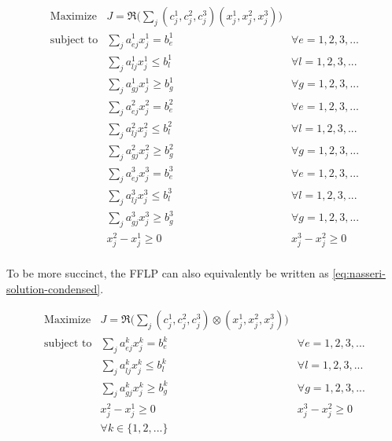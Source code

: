 \documentclass[11pt,a4paper,final]{article}
\let\ref\autoref                                      %
\begin{document}
\begin{equation}
\label{eq:nasseri-solution}
\begin{array}{lll}
\text{Maximize}   & J = \mathfrak{R}\Big(\sum_j (c_j^1,c_j^2,c_j^3)(x_j^1,x_j^2,x_j^3)\Big) &\\
\text{subject to} & \sum_j a_{ej}^1 x_j^1 = b_e^1 &  \forall e = 1,2,3,... \\
                  & \sum_j a_{lj}^1 x_j^1 \le b_l^1 &  \forall l = 1,2,3,... \\
                  & \sum_j a_{gj}^1 x_j^1 \ge b_g^1  &  \forall g = 1,2,3,... \\
                  & \sum_j a_{ej}^2 x_j^2 = b_e^2 &  \forall e = 1,2,3,... \\
                  & \sum_j a_{lj}^2 x_j^2 \le b_l^2 &  \forall l = 1,2,3,... \\
                  & \sum_j a_{gj}^2 x_j^2 \ge b_g^2  &  \forall g = 1,2,3,... \\
                  & \sum_j a_{ej}^3 x_j^3 = b_e^3 &  \forall e = 1,2,3,... \\
                  & \sum_j a_{lj}^3 x_j^3 \le b_l^3 &  \forall l = 1,2,3,... \\
                  & \sum_j a_{gj}^3 x_j^3 \ge b_g^3  &  \forall g = 1,2,3,... \\
                  & x_j^2 - x_j^1 \ge 0         & x_j^3 - x_j^2 \ge 0 \\
\end{array}
\end{equation}

\noindent
To be more succinct, the FFLP can also equivalently be written as \ref{eq:nasseri-solution-condensed}.

\begin{equation}
\label{eq:nasseri-solution-condensed}
\begin{array}{lll}
\text{Maximize}   & J = \mathfrak{R}\Big(\sum_j (c_j^1,c_j^2,c_j^3) \otimes (x_j^1,x_j^2,x_j^3)\Big) &\\
\text{subject to} & \sum_j a_{ej}^k x_j^k = b_e^k &  \forall e = 1,2,3,... \\
                  & \sum_j a_{lj}^k x_j^k \le b_l^k &  \forall l = 1,2,3,... \\
                  & \sum_j a_{gj}^k x_j^k \ge b_g^k  &  \forall g = 1,2,3,... \\
                  & x_j^2 - x_j^1 \ge 0         & x_j^3 - x_j^2 \ge 0 \\
                  & \forall k \in \{1,2,...\}        &                  \\
\end{array}
\end{equation}
\end{document}
